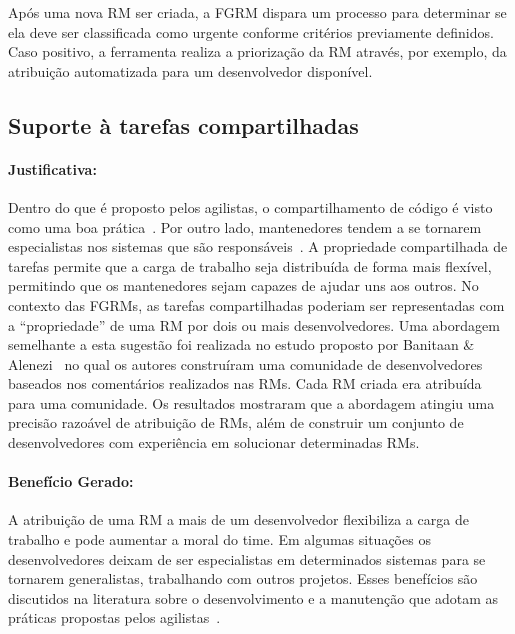 Após uma nova RM ser criada, a FGRM dispara um processo para determinar se ela
deve ser classificada como urgente conforme critérios previamente definidos.
Caso positivo, a ferramenta realiza a priorização da RM através, por exemplo, da
atribuição automatizada para um desenvolvedor disponível.

\subsection{Suporte à tarefas compartilhadas}
\label{sub:suporte_tarefas_compartilhadas}


\paragraph{Justificativa:}
\label{par:justificativa_s08}

Dentro do que é proposto pelos agilistas, o compartilhamento de código é visto
como uma boa prática~\cite{meyer2014agile}. Por outro lado, mantenedores tendem
a se tornarem especialistas nos sistemas que são
responsáveis~\cite{singer1998practices}. A propriedade compartilhada de tarefas
permite que a carga de trabalho seja distribuída de forma mais flexível,
permitindo que os mantenedores sejam capazes de ajudar uns aos outros. No
contexto das FGRMs, as tarefas compartilhadas poderiam ser representadas com a
``propriedade'' de uma RM por dois ou mais desenvolvedores. Uma abordagem
semelhante a esta sugestão foi realizada no estudo proposto por Banitaan \&
Alenezi~\cite{banitaan2013decoba} no qual os autores construíram uma comunidade
de desenvolvedores baseados nos comentários realizados nas RMs. Cada RM criada
era atribuída para uma comunidade. Os resultados mostraram que a abordagem
atingiu uma precisão razoável de atribuição de RMs, além de construir um
conjunto de desenvolvedores com experiência em solucionar determinadas RMs.

\paragraph{Benefício Gerado:}
\label{par:papéis_afetados_s08}

A atribuição de uma RM a mais de um desenvolvedor flexibiliza a carga de
trabalho e pode aumentar a moral do time. Em algumas situações os
desenvolvedores deixam de ser especialistas em determinados sistemas para se
tornarem generalistas, trabalhando com outros projetos. Esses benefícios são
discutidos na literatura sobre o desenvolvimento e a manutenção que adotam as
práticas propostas pelos agilistas~\cite{dybaa2008empirical,rudzki2009agile}.

